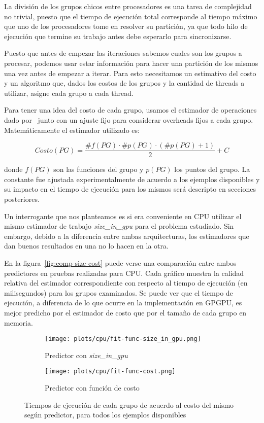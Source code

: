 La divisi\'on de los grupos chicos entre procesadores es una tarea de complejidad
no trivial, puesto que el tiempo de ejecuci\'on total corresponde al tiempo m\'aximo
que uno de los procesadores tome en resolver su partici\'on, ya que todo hilo de 
ejecuci\'on que termine su trabajo antes debe esperarlo para sincronizarse.

Puesto que antes de empezar las iteraciones sabemos cuales son los grupos a 
procesar, podemos usar estar informaci\'on para hacer una partici\'on de los mismos
una vez antes de empezar a iterar. Para esto necesitamos un estimativo del costo
y un algoritmo que, dados los costos de los grupos y la cantidad de threads a 
utilizar, asigne cada grupo a cada thread.

Para tener una idea del costo de cada grupo, usamos el estimador de operaciones
dado por~\cite{LIO} junto con un ajuste fijo para considerar overheads fijos a 
cada grupo. Matem\'aticamente el estimador utilizado es:

\begin{equation}
    Costo(PG) = \frac{\#f(PG) \cdot \#p(PG) \cdot (\#p(PG) + 1)}{2} + C
\end{equation}

donde $f(PG)$ son las funciones del grupo y $p(PG)$ los puntos del grupo. La 
constante fue ajustada experimentalmente de acuerdo a los ejemplos disponibles y
su impacto en el tiempo de ejecuci\'on para los mismos ser\'a descripto en 
secciones posteriores.

Un interrogante que nos planteamos es si era conveniente en CPU utilizar el mismo
estimador de trabajo \textit{size\_in\_gpu} para el problema estudiado. Sin 
embargo, debido a la diferencia entre ambas arquitecturas, los estimadores que
dan buenos resultados en una no lo hacen en la otra.

En la figura~\ref{fig:comp-size-cost} puede verse una comparaci\'on entre ambos
predictores en pruebas realizadas para CPU. Cada gr\'afico muestra la calidad
relativa del estimador correspondiente con respecto al tiempo de ejecuci\'on 
(en milisegundos) para los grupos examinados. Se puede ver que el tiempo de
ejecuci\'on, a diferencia de lo que ocurre en la implementaci\'on en GPGPU, es
mejor predicho por el estimador de costo que por el tama\~no de cada grupo en
memoria.

\begin{figure}[htbp]
   \centering
   \begin{subfigure}[b]{\plotwidthtres}
     \texttt{[image: plots/cpu/fit-func-size\_in\_gpu.png]}
     \caption{Predictor con \textit{size\_in\_gpu}}
   \end{subfigure}
   \begin{subfigure}[b]{\plotwidthtres}
     \texttt{[image: plots/cpu/fit-func-cost.png]}
     \caption{Predictor con funci\'on de costo}
   \end{subfigure}
   \caption{Tiempos de ejecuci\'on de cada grupo de acuerdo al costo del mismo seg\'un predictor, para todos los ejemplos disponibles}
   \label{fig:lio-histo-groups}
\end{figure}
 
